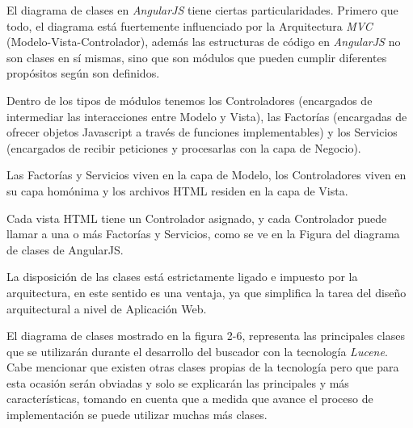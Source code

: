 \documentclass{memoria}
\begin{document}
\newpage
{}


El diagrama de clases en \textsl{AngularJS} tiene ciertas particularidades. Primero que todo, el diagrama está fuertemente influenciado por la Arquitectura \textsl{MVC} (Modelo-Vista-Controlador), además las estructuras de código en \textsl{AngularJS} no son clases en sí mismas, sino que son módulos que pueden cumplir diferentes propósitos según son definidos.

Dentro de los tipos de módulos tenemos los Controladores (encargados de intermediar las interacciones entre Modelo y Vista), las Factorías (encargadas de ofrecer objetos Javascript a través de funciones implementables) y los Servicios (encargados de recibir peticiones y procesarlas con la capa de Negocio).

Las Factorías y Servicios viven en la capa de Modelo, los Controladores viven en su capa homónima y los archivos HTML residen en la capa de Vista.

Cada vista HTML tiene un Controlador asignado, y cada Controlador puede llamar a una o más Factorías y Servicios, como se ve en la Figura del diagrama de clases de AngularJS.

La disposición de las clases está estrictamente ligado e impuesto por la arquitectura, en este sentido es una ventaja, ya que simplifica la tarea del diseño arquitectural a nivel de Aplicación Web.

\newpage
{}

El diagrama de clases mostrado en la figura 2-6, representa las principales clases que se utilizarán durante el desarrollo del buscador con la tecnología \textsl{Lucene}. Cabe mencionar que existen otras clases propias de la tecnología pero que para esta ocasión serán obviadas y solo se explicarán las principales y más características, tomando en cuenta que a medida que avance el proceso de implementación se puede utilizar muchas más clases.
\end{document}
